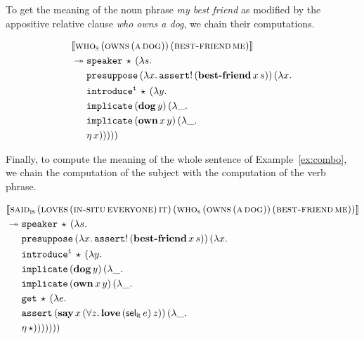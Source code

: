 To get the meaning of the noun phrase \emph{my best friend} as modified by
the appositive relative clause \emph{who owns a dog}, we chain their
computations.

\begin{align*}
  &\llbracket \textsc{who}_{\textsc{s}}\,(\textsc{owns}\,(\textsc{a}\,\textsc{dog}))\,(\textsc{best-friend}\,\textsc{me}) \rrbracket \\
  &\twoheadrightarrow \begin{aligned}[t]
      &\mathtt{speaker}\,\star\,(\lambda s.\,  \\
      &\mathtt{presuppose}\,(\lambda x.\, \mathtt{assert}!\,(\textbf{best-friend}\,x\,s))\,(\lambda x.\,  \\
      &\mathtt{introduce^i}\,\star\,(\lambda y.\,  \\
      &\mathtt{implicate}\,(\textbf{dog}\,y)\,(\lambda \_.\,  \\
      &\mathtt{implicate}\,(\textbf{own}\,x\,y)\,(\lambda \_.\,  \\
      &\eta\,x)))))
    \end{aligned}
\end{align*}

Finally, to compute the meaning of the whole sentence of
Example~\ref{ex:combo}, we chain the computation of the subject with the
computation of the verb phrase.

\begin{align*}
& \llbracket \textsc{said}_{\textsc{is}}\,(\textsc{loves}\,(\textsc{in-situ}\,\textsc{everyone})\,\textsc{it})\,(\textsc{who}_{\textsc{s}}\,(\textsc{owns}\,(\textsc{a}\,\textsc{dog}))\,(\textsc{best-friend}\,\textsc{me})) \rrbracket \\
& \twoheadrightarrow \begin{aligned}[t]
      &\mathtt{speaker}\,\star\,(\lambda s.\,  \\
      &\mathtt{presuppose}\,(\lambda x.\, \mathtt{assert}!\,(\textbf{best-friend}\,x\,s))\,(\lambda x.\,  \\
      &\mathtt{introduce^i}\,\star\,(\lambda y.\,  \\
      &\mathtt{implicate}\,(\textbf{dog}\,y)\,(\lambda \_.\,  \\
      &\mathtt{implicate}\,(\textbf{own}\,x\,y)\,(\lambda \_.\,  \\
      &\mathtt{get}\,\star\,(\lambda e.\,  \\
      &\mathtt{assert}\,(\textbf{say}\,x\,(\forall z.\, \textbf{love}\,(\textsf{sel}_{\textsf{it}}\,e)\,z))\,(\lambda \_.\,  \\
      &\eta\,\star)))))))
    \end{aligned}
\end{align*}

